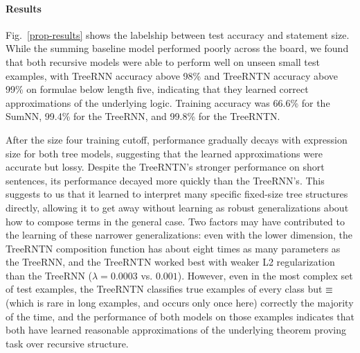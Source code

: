 \paragraph{Results} Fig.~\ref{prop-results} shows the labelship
between test accuracy and statement size. While the summing baseline model performed poorly across the board, we found that both recursive
models were able to perform well on unseen small test examples, 
with TreeRNN accuracy above
98\% and TreeRNTN accuracy above 99\% on formulae below length five, indicating
that they learned correct approximations of the underlying
logic. Training accuracy was 66.6\% for the SumNN, 99.4\% for the TreeRNN, and 99.8\% for the TreeRNTN.

After the size four training cutoff, performance gradually decays with expression size for both tree models, suggesting that the learned approximations were accurate but lossy.
Despite the TreeRNTN's stronger performance on short sentences, its performance
decayed more quickly than the TreeRNN's. 
This suggests to us that it learned to interpret many specific fixed-size tree structures directly,
allowing it to get away without learning as robust generalizations about how to compose
terms in the general case.
Two factors may have contributed to the learning of these narrower generalizations: 
even with the lower dimension,
the TreeRNTN composition function has about eight times as many parameters as the
TreeRNN, and the TreeRNTN worked best with weaker L2 regularization than the 
TreeRNN ($\lambda = 0.0003$ vs. $0.001$). 
However, even in the most complex set of test examples, the TreeRNTN classifies true examples of every
 class but $\equiv$ (which is rare in long examples, and occurs only once here) correctly 
the majority of the time, and
 the performance of both models on those examples indicates that both have learned
  reasonable approximations of the underlying theorem proving task over recursive structure.

























